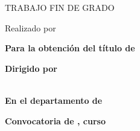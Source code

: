 \thispagestyle{empty} %
\begin{center}

\vspace*{1cm}


\vspace*{3cm}
\begin{large}
TRABAJO FIN DE GRADO
\end{large}

\vspace*{0.1in}
\textbf{\huge \tfgTitle}

\vspace*{.2in}

{\large Realizado por}\\
\textbf{\Large \tfgAuthors}

\vspace*{3cm}

\textbf{Para la obtención del título de}\\
{\large \tfgDegree}

\vspace*{0.2in}

\textbf{Dirigido por}\\
{\large \tfgSupervisor}\\

\vspace*{0.2in}

\textbf{En el departamento de}\\
{\large \tfgDepartment}

\vspace*{.6in}
\textbf{\Large Convocatoria de \tfgMonth, curso \tfgYear}

\end{center}

\ifdefined\tfgDedication
    \newpage
    \thispagestyle{empty}
    
    \vspace*{\fill}
    \begin{center}
    \textit{\tfgDedication}
    \end{center}
    \vspace*{\fill}
\fi

\clearpage\setcounter{page}{1} %
